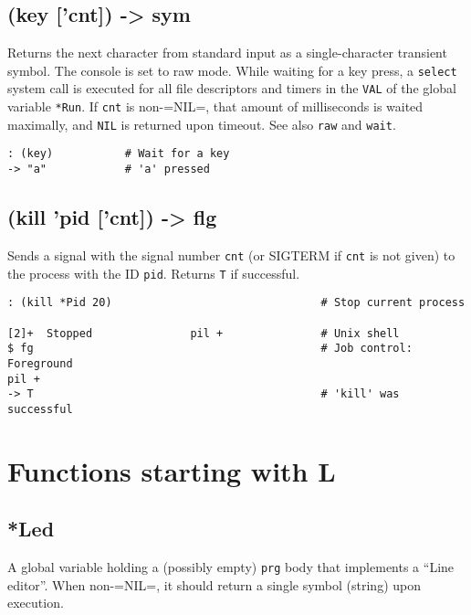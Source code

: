 {{{{{{ 
\section{(key ['cnt]) -> sym}
\label{sec-8-1-11-2}


Returns the next character from standard input as a single-character
transient symbol. The console is set to raw mode. While waiting for a
key press, a \texttt{select} system call is executed for all file descriptors
and timers in the \texttt{VAL} of the global variable \texttt{*Run}. If \texttt{cnt} is
non-=NIL=, that amount of milliseconds is waited maximally, and \texttt{NIL} is
returned upon timeout. See also \texttt{raw} and \texttt{wait}.


\begin{verbatim}
: (key)           # Wait for a key
-> "a"            # 'a' pressed
\end{verbatim}

 
\section{(kill 'pid ['cnt]) -> flg}
\label{sec-8-1-11-3}


Sends a signal with the signal number \texttt{cnt} (or SIGTERM if \texttt{cnt} is not
given) to the process with the ID \texttt{pid}. Returns \texttt{T} if successful.


\begin{verbatim}
: (kill *Pid 20)                                # Stop current process

[2]+  Stopped               pil +               # Unix shell
$ fg                                            # Job control: Foreground
pil +
-> T                                            # 'kill' was successful
\end{verbatim}


\chapter{Functions starting with L}
\label{sec-8-1-12}


 
\section{*Led}
\label{sec-8-1-12-1}


A global variable holding a (possibly empty) \texttt{prg} body that implements
a ``Line editor''. When non-=NIL=, it should return a single symbol
(string) upon execution.


}}}}}}
